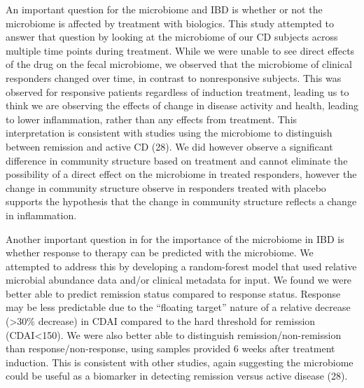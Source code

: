 \documentclass[11pt,]{article}
\begin{document}
An important question for the microbiome and IBD is whether or not the
microbiome is affected by treatment with biologics. This study attempted
to answer that question by looking at the microbiome of our CD subjects
across multiple time points during treatment. While we were unable to
see direct effects of the drug on the fecal microbiome, we observed that
the microbiome of clinical responders changed over time, in contrast to
nonresponsive subjects. This was observed for responsive patients
regardless of induction treatment, leading us to think we are observing
the effects of change in disease activity and health, leading to lower
inflammation, rather than any effects from treatment. This
interpretation is consistent with studies using the microbiome to
distinguish between remission and active CD (28). We did however observe
a significant difference in community structure based on treatment and
cannot eliminate the possibility of a direct effect on the microbiome in
treated responders, however the change in community structure observe in
responders treated with placebo supports the hypothesis that the change
in community structure reflects a change in inflammation.

Another important question in for the importance of the microbiome in
IBD is whether response to therapy can be predicted with the microbiome.
We attempted to address this by developing a random-forest model that
used relative microbial abundance data and/or clinical metadata for
input. We found we were better able to predict remission status compared
to response status. Response may be less predictable due to the
``floating target'' nature of a relative decrease (\textgreater{}30\%
decrease) in CDAI compared to the hard threshold for remission
(CDAI\textless{}150). We were also better able to distinguish
remission/non-remission than response/non-response, using samples
provided 6 weeks after treatment induction. This is consistent with
other studies, again suggesting the microbiome could be useful as a
biomarker in detecting remission versus active disease (28).
\end{document}
